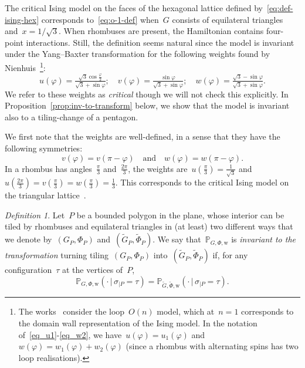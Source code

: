 \documentclass[reqno,11pt,a4paper]{amsart}
\theoremstyle{remark}
\newtheorem{definition}[proposition]{Definition}
\newcommand{\bbP}{\mathbb{P}}
\newcommand{\weight}{\mathrm{w}}
\begin{document}
The critical Ising model on the faces of the hexagonal lattice defined by~\eqref{eq:def-ising-hex} corresponds to~\eqref{eq:o-1-def} when~$G$ consists of equilateral triangles and~$x=1/\sqrt3$.
When rhombuses are present, the Hamiltonian contains four-point interactions.
Still, the definition seems natural since the model is invariant under the Yang--Baxter transformation for the following weights found by Nienhuis~\cite{Nie90}\footnote{The works~\cite{Nie90,IkhCar09} consider the loop~$O(n)$ model, which at~$n=1$ corresponds to the domain wall representation of the Ising model.
In the notation of~\eqref{eq_u1}-\eqref{eq_w2}, we have~$u(\varphi) = u_1(\varphi)$ and~$w(\varphi) = w_1(\varphi) + w_2(\varphi)$ (since a rhombus with alternating spins has two loop realisations).}:
\begin{equation} \label{eq:weights}
	u(\varphi) = \tfrac{\sqrt{3} \cos \tfrac{\varphi}2}{\sqrt{3}+\sin\varphi}; \quad
	v(\varphi) = \tfrac{\sin \varphi}{\sqrt{3}+\sin\varphi}; \quad
	w(\varphi) = \tfrac{\sqrt{3} - \sin \varphi}{\sqrt{3}+\sin\varphi}.
\end{equation}
We refer to these weights as {\em critical} though we will not check this explicitly.
In Proposition~\ref{prop:inv-to-transform} below, we show that the model is invariant also to a tiling-change of a pentagon.

We first note that the weights are well-defined, in a sense that they have the following symmetries:
\[
	v(\varphi) = v(\pi-\varphi) \quad \text{and} \quad w(\varphi) = w(\pi-\varphi).
\]
In a rhombus has angles~$\frac{\pi}{3}$ and~$\frac{2\pi}{3}$, the weights are~$u(\frac{\pi}{3}) = \tfrac{1}{\sqrt{3}}$ and $u(\frac{2\pi}{3}) = v(\frac{\pi}{3}) = w(\frac{\pi}{3}) = \tfrac13$.
This corresponds to the critical Ising model on the triangular lattice~\cite{Wan50}.

\begin{definition}\label{def:invariance-to-transform}
	Let~$P$ be a bounded polygon in the plane, whose interior can be tiled by rhombuses and equilateral triangles in (at least) two different ways that we denote by~$(G_{P},\Phi_P)$ and~$(\tilde{G}_{P},\tilde\Phi_P)$. 
	We say that~$\bbP_{G,\Phi,\weight}$ is {\em invariant to the transformation} turning tiling~$(G_{P},\Phi_P)$ into~$(\tilde{G}_{P},\tilde\Phi_P)$ if, for any configuration~$\tau$ at the vertices of~$P$,
	\[
		\bbP_{G,\Phi,\weight}(\cdot \, | \, \sigma_{| P} = \tau) = \bbP_{\tilde{G},\tilde{\Phi},\weight}(\cdot \, | \, \sigma_{| P} = \tau).
	\]
\end{definition}
\end{document}
